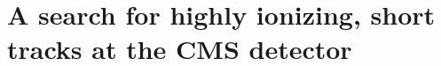 \documentclass[
twoside=true,
headsepline,     %
headings=normal,
open=right,
numbers=noenddot, %
a4paper
]{scrreprt} %
\begin{document}
\chapter{A search for highly ionizing, short tracks at the CMS detector} \label{sec:analysis}



% 


% 





\thispagestyle{empty}
\chapter*{~}
% 
\end{document}
